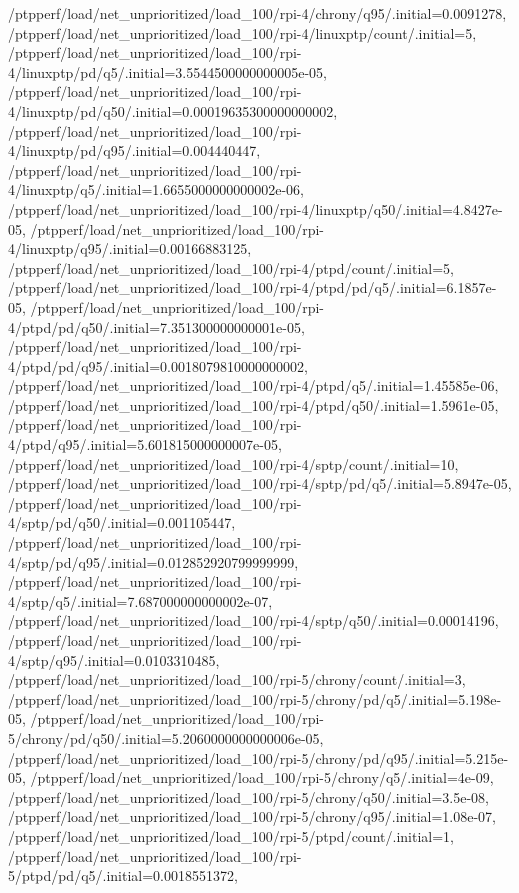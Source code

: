 {    /ptpperf/load/net_unprioritized/load_100/rpi-4/chrony/q95/.initial=0.0091278,
    /ptpperf/load/net_unprioritized/load_100/rpi-4/linuxptp/count/.initial=5,
    /ptpperf/load/net_unprioritized/load_100/rpi-4/linuxptp/pd/q5/.initial=3.5544500000000005e-05,
    /ptpperf/load/net_unprioritized/load_100/rpi-4/linuxptp/pd/q50/.initial=0.00019635300000000002,
    /ptpperf/load/net_unprioritized/load_100/rpi-4/linuxptp/pd/q95/.initial=0.004440447,
    /ptpperf/load/net_unprioritized/load_100/rpi-4/linuxptp/q5/.initial=1.6655000000000002e-06,
    /ptpperf/load/net_unprioritized/load_100/rpi-4/linuxptp/q50/.initial=4.8427e-05,
    /ptpperf/load/net_unprioritized/load_100/rpi-4/linuxptp/q95/.initial=0.00166883125,
    /ptpperf/load/net_unprioritized/load_100/rpi-4/ptpd/count/.initial=5,
    /ptpperf/load/net_unprioritized/load_100/rpi-4/ptpd/pd/q5/.initial=6.1857e-05,
    /ptpperf/load/net_unprioritized/load_100/rpi-4/ptpd/pd/q50/.initial=7.351300000000001e-05,
    /ptpperf/load/net_unprioritized/load_100/rpi-4/ptpd/pd/q95/.initial=0.0018079810000000002,
    /ptpperf/load/net_unprioritized/load_100/rpi-4/ptpd/q5/.initial=1.45585e-06,
    /ptpperf/load/net_unprioritized/load_100/rpi-4/ptpd/q50/.initial=1.5961e-05,
    /ptpperf/load/net_unprioritized/load_100/rpi-4/ptpd/q95/.initial=5.601815000000007e-05,
    /ptpperf/load/net_unprioritized/load_100/rpi-4/sptp/count/.initial=10,
    /ptpperf/load/net_unprioritized/load_100/rpi-4/sptp/pd/q5/.initial=5.8947e-05,
    /ptpperf/load/net_unprioritized/load_100/rpi-4/sptp/pd/q50/.initial=0.001105447,
    /ptpperf/load/net_unprioritized/load_100/rpi-4/sptp/pd/q95/.initial=0.012852920799999999,
    /ptpperf/load/net_unprioritized/load_100/rpi-4/sptp/q5/.initial=7.687000000000002e-07,
    /ptpperf/load/net_unprioritized/load_100/rpi-4/sptp/q50/.initial=0.00014196,
    /ptpperf/load/net_unprioritized/load_100/rpi-4/sptp/q95/.initial=0.0103310485,
    /ptpperf/load/net_unprioritized/load_100/rpi-5/chrony/count/.initial=3,
    /ptpperf/load/net_unprioritized/load_100/rpi-5/chrony/pd/q5/.initial=5.198e-05,
    /ptpperf/load/net_unprioritized/load_100/rpi-5/chrony/pd/q50/.initial=5.2060000000000006e-05,
    /ptpperf/load/net_unprioritized/load_100/rpi-5/chrony/pd/q95/.initial=5.215e-05,
    /ptpperf/load/net_unprioritized/load_100/rpi-5/chrony/q5/.initial=4e-09,
    /ptpperf/load/net_unprioritized/load_100/rpi-5/chrony/q50/.initial=3.5e-08,
    /ptpperf/load/net_unprioritized/load_100/rpi-5/chrony/q95/.initial=1.08e-07,
    /ptpperf/load/net_unprioritized/load_100/rpi-5/ptpd/count/.initial=1,
    /ptpperf/load/net_unprioritized/load_100/rpi-5/ptpd/pd/q5/.initial=0.0018551372,
}
